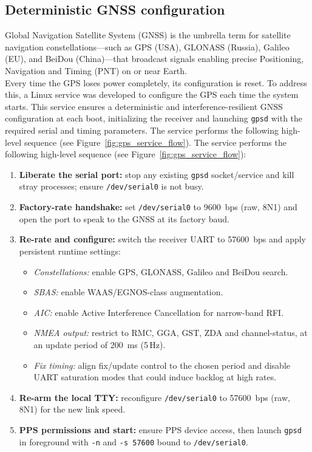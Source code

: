 \subsection{Deterministic GNSS configuration}
\label{subsec:gps_boot_service}

\noindent Global Navigation Satellite System (GNSS) is the umbrella term for satellite
navigation constellations—such as GPS (USA), GLONASS (Russia), Galileo (EU), and
BeiDou (China)—that broadcast signals enabling precise Positioning, Navigation
and Timing (PNT) on or near Earth.\\

\noindent Every time the GPS loses power completely, its configuration is reset. To address this, a Linux service was developed to configure the GPS each time the system starts. This service ensures a deterministic and interference-resilient GNSS configuration at each boot, initializing the receiver and launching \texttt{gpsd} with the required serial and timing parameters. The service performs the following high-level sequence (see Figure~\ref{fig:gps_service_flow}). The service performs the following high-level sequence (see Figure~\ref{fig:gps_service_flow}):

\begin{enumerate}
  \item \textbf{Liberate the serial port:} stop any existing \texttt{gpsd} socket/service and kill stray processes; ensure \texttt{/dev/serial0} is not busy.
  \item \textbf{Factory-rate handshake:} set \texttt{/dev/serial0} to \SI{9600}{bps} (raw, 8N1) and open the port to speak to the GNSS at its factory baud.
  \item \textbf{Re-rate and configure:} switch the receiver UART to \SI{57600}{bps} and apply persistent runtime settings:
  \begin{itemize}
    \item \textit{Constellations:} enable GPS, GLONASS, Galileo and BeiDou search.
    \item \textit{SBAS:} enable WAAS/EGNOS-class augmentation.
    \item \textit{AIC:} enable Active Interference Cancellation for narrow-band RFI.
    \item \textit{NMEA output:} restrict to RMC, GGA, GST, ZDA and channel-status, at an update period of \SI{200}{ms} (5\,Hz).
    \item \textit{Fix timing:} align fix/update control to the chosen period and disable UART saturation modes that could induce backlog at high rates.
  \end{itemize}
  \item \textbf{Re-arm the local TTY:} reconfigure \texttt{/dev/serial0} to \SI{57600}{bps} (raw, 8N1) for the new link speed.
  \item \textbf{PPS permissions and start:} ensure PPS device access, then launch \texttt{gpsd} in foreground with \texttt{-n} and \texttt{-s 57600} bound to \texttt{/dev/serial0}.
\end{enumerate}



